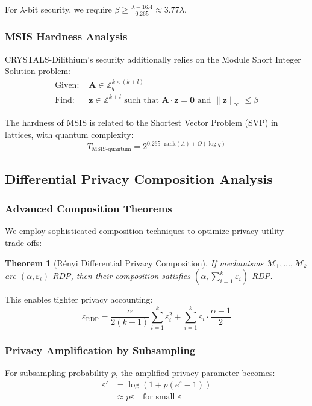 \documentclass[journal,onecolumn]{IEEEtran}
\newtheorem{theorem}{Theorem}
\begin{document}
For $\lambda$-bit security, we require $\beta \geq \frac{\lambda - 16.4}{0.265} \approx 3.77\lambda$.

\subsubsection{MSIS Hardness Analysis}

CRYSTALS-Dilithium's security additionally relies on the Module Short Integer Solution problem:
\begin{align}
\text{Given: } &\mathbf{A} \in \mathbb{Z}_q^{k \times (k+l)} \\
\text{Find: } &\mathbf{z} \in \mathbb{Z}^{k+l} \text{ such that } \mathbf{A} \cdot \mathbf{z} = \mathbf{0} \text{ and } \|\mathbf{z}\|_\infty \leq \beta
\end{align}

The hardness of MSIS is related to the Shortest Vector Problem (SVP) in lattices, with quantum complexity:
$$T_{\text{MSIS-quantum}} = 2^{0.265 \cdot \text{rank}(\Lambda) + O(\log q)}$$

\subsection{Differential Privacy Composition Analysis}

\subsubsection{Advanced Composition Theorems}

We employ sophisticated composition techniques to optimize privacy-utility trade-offs:

\begin{theorem}[Rényi Differential Privacy Composition]
If mechanisms $\mathcal{M}_1, \ldots, \mathcal{M}_k$ are $(\alpha, \varepsilon_i)$-RDP, then their composition satisfies $(\alpha, \sum_{i=1}^k \varepsilon_i)$-RDP.
\end{theorem}

This enables tighter privacy accounting:
$$\varepsilon_{\text{RDP}} = \frac{\alpha}{2(k-1)} \sum_{i=1}^k \varepsilon_i^2 + \sum_{i=1}^k \varepsilon_i \cdot \frac{\alpha-1}{2}$$

\subsubsection{Privacy Amplification by Subsampling}

For subsampling probability $p$, the amplified privacy parameter becomes:
\begin{align}
\varepsilon' &= \log\left(1 + p(e^\varepsilon - 1)\right) \\
&\approx p\varepsilon \quad \text{for small } \varepsilon
\end{align}
\end{document}
